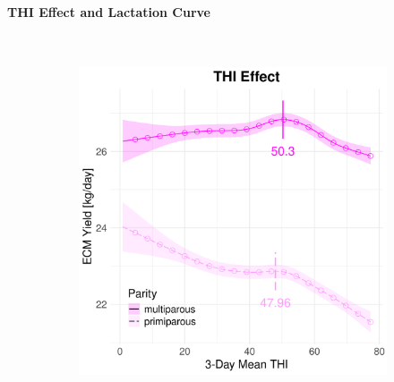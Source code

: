 \newpage
\paragraph{THI Effect and Lactation Curve} \quad \\
\begin{figure}[H]
    \centering
    \begin{subfigure}[b]{0.45\textwidth}
        \centering
        \includegraphics[width=\textwidth]{thesis/figures/models/ecm/after2010/sf_ecm_after2010/sf_ecm_after2010_marginal_thi_milk_combined.png}
    \end{subfigure}
    \hspace{0.05\textwidth} %
    \begin{subfigure}[b]{0.45\textwidth}
        \centering

\end{subfigure}
\end{figure}
